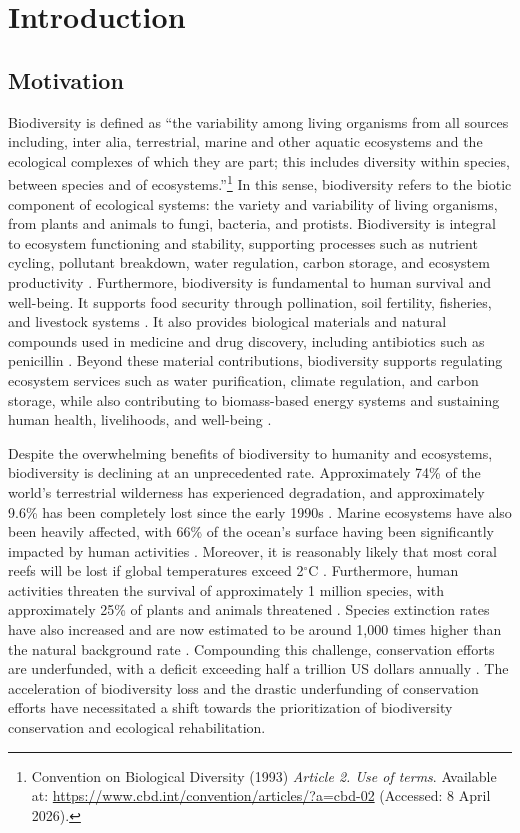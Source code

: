 \section{Introduction}
\subsection{Motivation}
Biodiversity is defined as ``the variability among living organisms from all sources including, inter alia, terrestrial, marine and other aquatic ecosystems and the ecological complexes of which they are part; this includes diversity within species, between species and of ecosystems.''\footnote{Convention on Biological Diversity (1993) \textit{Article 2. Use of terms}. Available at: \url{https://www.cbd.int/convention/articles/?a=cbd-02} (Accessed: 8 April 2026).} In this sense, biodiversity refers to the biotic component of ecological systems: the variety and variability of living organisms, from plants and animals to fungi, bacteria, and protists. Biodiversity is integral to ecosystem functioning and stability, supporting processes such as nutrient cycling, pollutant breakdown, water regulation, carbon storage, and ecosystem productivity \parencite{Stork2009, cardinale2012, gascon2015}. Furthermore, biodiversity is fundamental to human survival and well-being. It supports food security through pollination, soil fertility, fisheries, and livestock systems \parencite{gascon2015,brauman2020}. It also provides biological materials and natural compounds used in medicine and drug discovery, including antibiotics such as penicillin \parencite{gascon2015}. Beyond these material contributions, biodiversity supports regulating ecosystem services such as water purification, climate regulation, and carbon storage, while also contributing to biomass-based energy systems and sustaining human health, livelihoods, and well-being \parencite{brauman2020, naeem2016, kim2024}.

Despite the overwhelming benefits of biodiversity to humanity and ecosystems, biodiversity is declining at an unprecedented rate. Approximately 74\% of the world's terrestrial wilderness has experienced degradation, and approximately 9.6\% has been completely lost since the early 1990s \parencite{watson2016}. Marine ecosystems have also been heavily affected, with 66\% of the ocean's surface having been significantly impacted by human activities \parencite{diaz2019}. Moreover, it is reasonably likely that most coral reefs will be lost if global temperatures exceed 2$^\circ$C \parencite{frieler2012}. Furthermore, human activities threaten the survival of approximately 1 million species, with approximately 25\% of plants and animals threatened \parencite{diaz2019}. Species extinction rates have also increased and are now estimated to be around 1,000 times higher than the natural background rate \parencite{pimm2014}. Compounding this challenge, conservation efforts are underfunded, with a deficit exceeding half a trillion US dollars annually \parencite{Deutz2020}. The acceleration of biodiversity loss and the drastic underfunding of conservation efforts have necessitated a shift towards the prioritization of biodiversity conservation and ecological rehabilitation.

